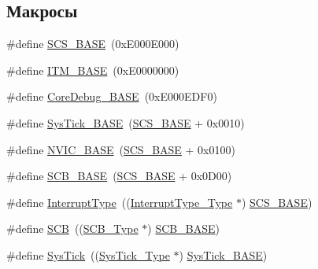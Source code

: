 \subsection*{Макросы}
\begin{DoxyCompactItemize}
\item 
\#define \mbox{\hyperlink{group___c_m_s_i_s___c_m3__core__register_ga3c14ed93192c8d9143322bbf77ebf770}{S\+C\+S\+\_\+\+B\+A\+SE}}~(0x\+E000\+E000)
\item 
\#define \mbox{\hyperlink{group___c_m_s_i_s___c_m3__core__register_gadd76251e412a195ec0a8f47227a8359e}{I\+T\+M\+\_\+\+B\+A\+SE}}~(0x\+E0000000)
\item 
\#define \mbox{\hyperlink{group___c_m_s_i_s___c_m3__core__register_ga680604dbcda9e9b31a1639fcffe5230b}{Core\+Debug\+\_\+\+B\+A\+SE}}~(0x\+E000\+E\+D\+F0)
\item 
\#define \mbox{\hyperlink{group___c_m_s_i_s___c_m3__core__register_ga58effaac0b93006b756d33209e814646}{Sys\+Tick\+\_\+\+B\+A\+SE}}~(\mbox{\hyperlink{group___c_m_s_i_s___c_m3__core__register_ga3c14ed93192c8d9143322bbf77ebf770}{S\+C\+S\+\_\+\+B\+A\+SE}} +  0x0010)
\item 
\#define \mbox{\hyperlink{group___c_m_s_i_s___c_m3__core__register_gaa0288691785a5f868238e0468b39523d}{N\+V\+I\+C\+\_\+\+B\+A\+SE}}~(\mbox{\hyperlink{group___c_m_s_i_s___c_m3__core__register_ga3c14ed93192c8d9143322bbf77ebf770}{S\+C\+S\+\_\+\+B\+A\+SE}} +  0x0100)
\item 
\#define \mbox{\hyperlink{group___c_m_s_i_s___c_m3__core__register_gad55a7ddb8d4b2398b0c1cfec76c0d9fd}{S\+C\+B\+\_\+\+B\+A\+SE}}~(\mbox{\hyperlink{group___c_m_s_i_s___c_m3__core__register_ga3c14ed93192c8d9143322bbf77ebf770}{S\+C\+S\+\_\+\+B\+A\+SE}} +  0x0\+D00)
\item 
\#define \mbox{\hyperlink{group___c_m_s_i_s___c_m3__core__register_ga164238adbad56f07c7dd4e912af748dd}{Interrupt\+Type}}~((\mbox{\hyperlink{struct_interrupt_type___type}{Interrupt\+Type\+\_\+\+Type}} $\ast$) \mbox{\hyperlink{group___c_m_s_i_s___c_m3__core__register_ga3c14ed93192c8d9143322bbf77ebf770}{S\+C\+S\+\_\+\+B\+A\+SE}})
\item 
\#define \mbox{\hyperlink{group___c_m_s_i_s___c_m3__core__register_gaaaf6477c2bde2f00f99e3c2fd1060b01}{S\+CB}}~((\mbox{\hyperlink{struct_s_c_b___type}{S\+C\+B\+\_\+\+Type}} $\ast$)           \mbox{\hyperlink{group___c_m_s_i_s___c_m3__core__register_gad55a7ddb8d4b2398b0c1cfec76c0d9fd}{S\+C\+B\+\_\+\+B\+A\+SE}})
\item 
\#define \mbox{\hyperlink{group___c_m_s_i_s___c_m3__core__register_gacd96c53beeaff8f603fcda425eb295de}{Sys\+Tick}}~((\mbox{\hyperlink{struct_sys_tick___type}{Sys\+Tick\+\_\+\+Type}} $\ast$)       \mbox{\hyperlink{group___c_m_s_i_s___c_m3__core__register_ga58effaac0b93006b756d33209e814646}{Sys\+Tick\+\_\+\+B\+A\+SE}})

\end{DoxyCompactItemize}
